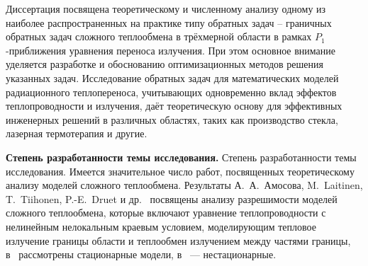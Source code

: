     Диссертация посвящена теоретическому и численному анализу одному из
    наиболее распространенных на практике типу обратных задач – граничных
    обратных задач сложного теплообмена в трёхмерной области в рамках
    $P_1$-приближения уравнения переноса излучения.
    При этом основное внимание уделяется разработке
    и обоснованию оптимизационных методов решения указанных задач.
    Исследование обратных задач для математических моделей
    радиационного теплопереноса, учитывающих одновременно вклад эффектов
    теплопроводности и излучения, даёт теоретическую основу для эффективных
    инженерных решений в различных областях, таких как производство стекла,
    лазерная термотерапия и другие.


    \textbf{Степень разработанности темы исследования.}
    Степень разработанности темы исследования.
    Имеется значительное число работ, посвященных теоретическому анализу моделей сложного
    теплообмена.
    Результаты А.\ А.\ Амосова, M.\ Laitinen, T.\ Tiihonen, P.-E.\ Druet и др.~\cite{
        Amosov2005,
        Amosov2009,
        Amosov2010nonstationary,
        amosov2010stationary,
        druet2009weak,
        druet2010weak,
        laitinen2001conductive,
        metzger1999existence,
        Philip2010,
        Tiihonen1997a,
        Tiihonen1997b,
        amosov17,
        amosov18,
        Amosov20,
        Amosov21-1,
        Amosov2021-2,
        Amosov23} %
    посвящены анализу разрешимости моделей сложного теплообмена,
    которые включают уравнение теплопроводности с нелинейным нелокальным
    краевым условием, моделирующим тепловое излучение границы области и
    теплообмен излучением между частями границы,
    в~\cite{Amosov2009, amosov2010stationary, druet2009weak, laitinen2001conductive,
        Philip2010, Tiihonen1997a, Tiihonen1997b} %
    рассмотрены стационарные модели,
    в~\cite{
        Amosov2005, Amosov2010nonstationary,
        druet2010weak, laitinen2001conductive,
        metzger1999existence,
        Philip2010,
        Tiihonen1997a} — нестационарные.%

